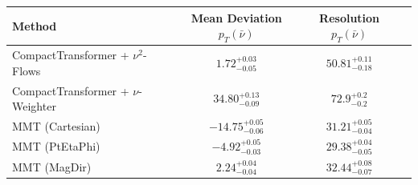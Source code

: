     \begin{tabular}{lccc}
        \toprule
        Method & Mean Deviation $p_{T}(\bar{\nu})$ & Resolution $p_{T}(\bar{\nu})$ \\
        \midrule
        CompactTransformer + $\nu^2$-Flows & $1.72^{+0.03}_{-0.05}$ & $50.81^{+0.11}_{-0.18}$ \\
        CompactTransformer + $\nu$-Weighter & $34.80^{+0.13}_{-0.09}$ & $72.9^{+0.2}_{-0.2}$ \\
        MMT (Cartesian) & $-14.75^{+0.05}_{-0.06}$ & $31.21^{+0.05}_{-0.04}$ \\
        MMT (PtEtaPhi) & $-4.92^{+0.05}_{-0.03}$ & $29.38^{+0.04}_{-0.05}$ \\
        MMT (MagDir) & $2.24^{+0.04}_{-0.04}$ & $32.44^{+0.08}_{-0.07}$ \\
        \bottomrule
    \end{tabular}